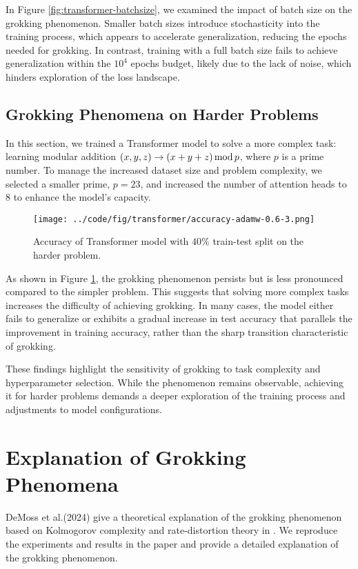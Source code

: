 \documentclass{article}
\begin{document}
In Figure \ref{fig:transformer-batchsize}, we examined the impact of batch size on the grokking phenomenon. Smaller batch sizes introduce stochasticity into the training process, which appears to accelerate generalization, reducing the epochs needed for grokking. In contrast, training with a full batch size fails to achieve generalization within the $10^4$ epochs budget, likely due to the lack of noise, which hinders exploration of the loss landscape.

\subsection{Grokking Phenomena on Harder Problems}

In this section, we trained a Transformer model to solve a more complex task: learning modular addition $(x, y, z) \rightarrow (x + y + z)\, {\rm mod}\, p$, where $p$ is a prime number. To manage the increased dataset size and problem complexity, we selected a smaller prime, $p=23$, and increased the number of attention heads to 8 to enhance the model's capacity.

\begin{figure}[ht]
    \centering
    \texttt{[image: ../code/fig/transformer/accuracy-adamw-0.6-3.png]}
    \caption{Accuracy of Transformer model with $40\%$ train-test split on the harder problem.}
    \label{fig:transformer-harder}
\end{figure}

As shown in Figure \ref{fig:transformer-harder}, the grokking phenomenon persists but is less pronounced compared to the simpler problem. This suggests that solving more complex tasks increases the difficulty of achieving grokking. In many cases, the model either fails to generalize or exhibits a gradual increase in test accuracy that parallels the improvement in training accuracy, rather than the sharp transition characteristic of grokking.

These findings highlight the sensitivity of grokking to task complexity and hyperparameter selection. While the phenomenon remains observable, achieving it for harder problems demands a deeper exploration of the training process and adjustments to model configurations.

\section{Explanation of Grokking Phenomena}

DeMoss et al.(2024) give a theoretical explanation of the grokking phenomenon based on Kolmogorov complexity and rate-distortion theory in \cite{demoss2024complexity}. We reproduce the experiments and results in the paper and provide a detailed explanation of the grokking phenomenon. 
\end{document}
